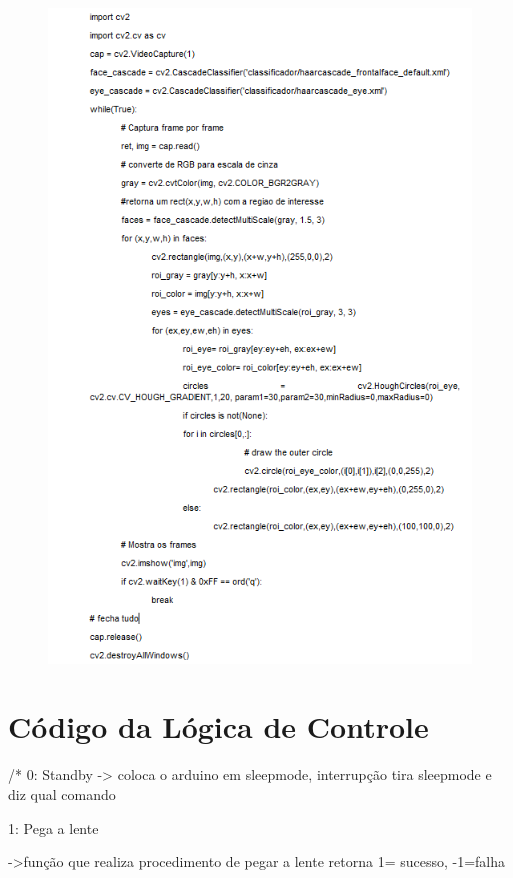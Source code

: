 \begin{apendicesenv}
\begin{figure}[H]
    \centering
      \includegraphics[scale=1.0]{figuras/img31.png}
    \label{img31}
\end{figure}




\chapter{Código da Lógica de Controle}

/*
    0: Standby -> coloca o arduino em sleepmode, interrupção tira sleepmode e diz qual comando
   
  1: Pega a lente
 
             ->função que realiza procedimento de pegar a lente retorna 1= sucesso, -1=falha


\end{apendicesenv}

